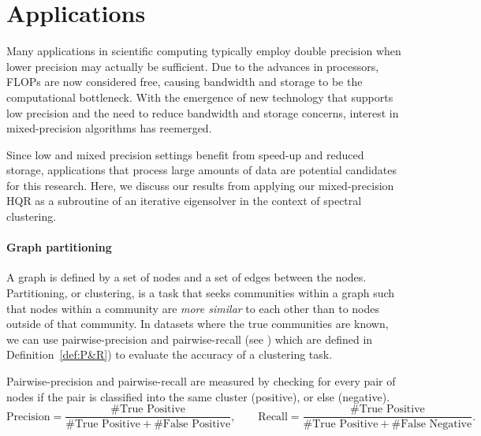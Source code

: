 \section{Applications}
\label{sec:Apps}
Many applications in scientific computing typically employ double precision when lower precision may actually be sufficient. 
Due to the advances in processors, FLOPs are now considered free, causing bandwidth and storage to be the computational bottleneck. 
With the emergence of new technology that supports low precision and the need to reduce bandwidth and storage concerns, interest in mixed-precision algorithms has reemerged. 

Since low and mixed precision settings benefit from speed-up and reduced storage, applications that process large amounts of data are potential candidates for this research.
Here, we discuss our results from applying our mixed-precision HQR as a subroutine of an iterative eigensolver in the context of spectral clustering.\par

\paragraph{Graph partitioning} A graph is defined by a set of nodes and a set of edges between the nodes.
Partitioning, or clustering, is a task that seeks communities within a graph such that nodes within a community are \emph{more similar} to each other than to nodes outside of that community. 
In datasets where the true communities are known, we can use pairwise-precision and pairwise-recall (see \cite{GraphChallenge})  which are defined in Definition~\ref{def:P&R}) to evaluate the accuracy of a clustering task.
\begin{definition}
	\label{def:P&R}
    Pairwise-precision and pairwise-recall are measured by checking for every pair of nodes if the pair is classified into the same cluster (positive), or else (negative).
	\begin{equation}
	\text{Precision} = \frac{\#\text{True Positive}}{\#\text{True Positive}+\#\text{False Positive}}, 
	\qquad
	\text{Recall} = \frac{\#\text{True Positive}}{\#\text{True Positive}+\#\text{False Negative}}.
	\end{equation}
\end{definition}

